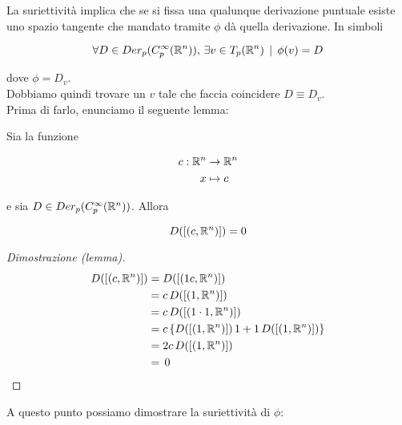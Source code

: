 La suriettività implica che se si fissa una qualunque derivazione puntuale esiste uno spazio tangente che mandato tramite $ \phi $ dà quella derivazione. In simboli

\begin{equation}
	\forall D \in Der_{p} (C_{p}^{\infty}(\mathbb{R}^{n})), \, \exists v \in T_{p}(\mathbb{R}^{n}) \, \mid \, \phi(v) = D
\end{equation}

dove $ \phi = D_{v} $.\\
Dobbiamo quindi trovare un $ v $ tale che faccia coincidere $ D \equiv D_{v} $.\\
Prima di farlo, enunciamo il seguente lemma:

\begin{lemma}
	Sia la funzione
	
	\begin{align}
		\begin{split}
			c : \mathbb{R}^{n} &\to \mathbb{R}^{n}\\
			x &\mapsto c
		\end{split}
	\end{align}

	e sia $ D \in Der_{p} (C_{p}^{\infty}(\mathbb{R}^{n})) $. Allora
	
	\begin{equation}
		D([(c,\mathbb{R}^{n})]) = 0
	\end{equation}
\end{lemma}

\begin{proof}[Dimostrazione (lemma)]
	\begin{align}
		\begin{split}
			D([(c,\mathbb{R}^{n})]) &= D([(1 c,\mathbb{R}^{n})])\\
			&= c \, D([(1,\mathbb{R}^{n})])\\
			&= c \, D([(1 \cdot 1,\mathbb{R}^{n})])\\
			&= c \, \{D([(1,\mathbb{R}^{n})]) \, 1 + 1 \, D([(1,\mathbb{R}^{n})])\}\\
			&= 2 c \, D([(1,\mathbb{R}^{n})])\\
			&= \, 0
		\end{split}
	\end{align}
\end{proof}

A questo punto possiamo dimostrare la suriettività di $ \phi $:

